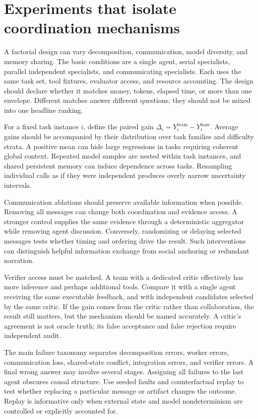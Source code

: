\section{Experiments that isolate coordination mechanisms}\label{sec:C21:experiments}
A factorial design can vary decomposition, communication, model diversity, and memory sharing. The basic conditions are a single agent, serial specialists, parallel independent specialists, and communicating specialists. Each uses the same task set, tool fixtures, evaluator access, and resource accounting. The design should declare whether it matches money, tokens, elapsed time, or more than one envelope. Different matches answer different questions; they should not be mixed into one headline ranking.

For a fixed task instance $i$, define the paired gain $\Delta_i=Y_i^{\mathrm{team}}-Y_i^{\mathrm{base}}$. Average gains should be accompanied by their distribution over task families and difficulty strata. A positive mean can hide large regressions in tasks requiring coherent global context. Repeated model samples are nested within task instances, and shared persistent memory can induce dependence across tasks. Resampling individual calls as if they were independent produces overly narrow uncertainty intervals.

Communication ablations should preserve available information when possible. Removing all messages can change both coordination and evidence access. A stronger control supplies the same evidence through a deterministic aggregator while removing agent discussion. Conversely, randomizing or delaying selected messages tests whether timing and ordering drive the result. Such interventions can distinguish helpful information exchange from social anchoring or redundant narration.

Verifier access must be matched. A team with a dedicated critic effectively has more inference and perhaps additional tools. Compare it with a single agent receiving the same executable feedback, and with independent candidates selected by the same critic. If the gain comes from the critic rather than collaboration, the result still matters, but the mechanism should be named accurately. A critic's agreement is not oracle truth; its false acceptance and false rejection require independent audit.

The main failure taxonomy separates decomposition errors, worker errors, communication loss, shared-state conflict, integration errors, and verifier errors. A final wrong answer may involve several stages. Assigning all failures to the last agent obscures causal structure. Use seeded faults and counterfactual replay to test whether replacing a particular message or artifact changes the outcome. Replay is informative only when external state and model nondeterminism are controlled or explicitly accounted for.

